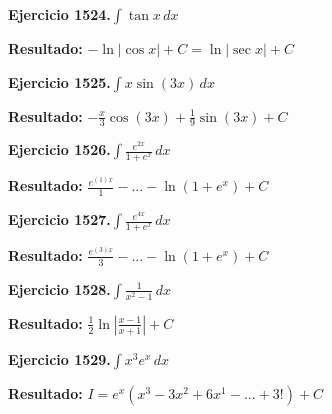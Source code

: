 \documentclass[10pt,a4paper]{article}
\begin{document}
\begin{ejbox}
\textbf{Ejercicio 1524.}\quad $\int \tan x\,dx$
\end{ejbox}

\begin{solbox}
\textbf{Resultado:} \(\displaystyle -\ln|\cos x| + C = \ln|\sec x| + C\)
\end{solbox}

\newpage
\begin{ejbox}
\textbf{Ejercicio 1525.}\quad $\int x \sin(3x)\,dx$
\end{ejbox}

\begin{solbox}
\textbf{Resultado:} \(\displaystyle -\frac{x}{3}\cos(3x) + \frac{1}{9}\sin(3x) + C\)
\end{solbox}

\begin{ejbox}
\textbf{Ejercicio 1526.}\quad $\int \frac{e^{2x}}{1+e^{x}}\,dx$
\end{ejbox}

\begin{solbox}
\textbf{Resultado:} \(\displaystyle \frac{e^{(1)x}}{1} - ... - \ln(1+e^x) + C\)
\end{solbox}

\begin{ejbox}
\textbf{Ejercicio 1527.}\quad $\int \frac{e^{4x}}{1+e^{x}}\,dx$
\end{ejbox}

\begin{solbox}
\textbf{Resultado:} \(\displaystyle \frac{e^{(3)x}}{3} - ... - \ln(1+e^x) + C\)
\end{solbox}

\newpage
\begin{ejbox}
\textbf{Ejercicio 1528.}\quad $\int \frac{1}{x^2-1}\,dx$
\end{ejbox}

\begin{solbox}
\textbf{Resultado:} \(\displaystyle \frac{1}{2}\ln\left|\frac{x-1}{x+1}\right| + C\)
\end{solbox}

\begin{ejbox}
\textbf{Ejercicio 1529.}\quad $\int x^{3} e^x\,dx$
\end{ejbox}

\begin{solbox}
\textbf{Resultado:} \(\displaystyle I = e^x(x^{3} - 3x^{2} + 6x^{1} - ... + 3!) + C\)
\end{solbox}
\end{document}
